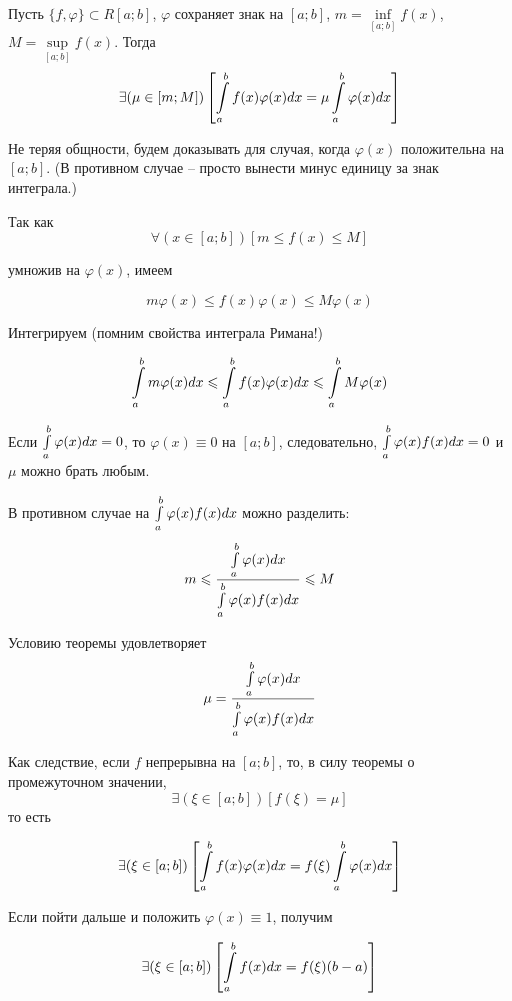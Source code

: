 \begin{teorema}
Пусть $\{f,\varphi\}\subset R[a;b]$, $\varphi$ сохраняет знак на $[a;b]$, $m=\inf\limits_{[a;b]}f(x)$, $M=\sup\limits_{[a;b]}f(x)$.
Тогда 
$$
\exists(\mu\in[m;M])\left[
\int\limits_a^b f(x)\varphi(x) dx=\mu\int\limits_a^b \varphi(x) dx
\right]
$$
\end{teorema}

\dokvo
Не теряя общности, будем доказывать для случая, когда $\varphi(x)$ положительна на $[a;b]$.
(В противном случае -- просто вынести минус единицу за знак интеграла.)

Так как
$$
\forall(x\in[a;b])[m\leq f(x)\leq M]
$$

умножив на $\varphi(x)$, имеем

$$
m\varphi(x)\leq f(x)\varphi(x) \leq M\varphi(x)
$$

Интегрируем (помним свойства интеграла Римана!)

$$
\int\limits_a^b m\varphi(x) dx \leqslant \int\limits_a^b f(x)\varphi(x) dx \leqslant \int\limits_a^b M\varphi(x)
$$

Если $\int\limits_a^b\varphi(x) dx =0$, то $\varphi(x)\equiv 0$ на $[a;b]$, следовательно, $\int\limits_a^b\varphi(x)f(x) dx=0$ и $\mu$ можно брать любым.

В противном случае на $\int\limits_a^b\varphi(x)f(x)dx$ можно разделить:
$$
m\leqslant\frac{\int\limits_a^b\varphi(x)dx }{\int\limits_a^b\varphi(x)f(x)dx }\leqslant M
$$

Условию теоремы удовлетворяет
$$
\mu=\frac{\int\limits_a^b\varphi(x)dx}{\int\limits_a^b\varphi(x)f(x)dx}
$$

\dokno

Как следствие, если $f$ непрерывна на $[a;b]$, то, в силу теоремы о промежуточном значении, 
$$
\exists(\xi\in[a;b])[f(\xi)=\mu]
$$
то есть 

$$
\exists(\xi\in[a;b])\left[
\int\limits_a^b f(x)\varphi(x) dx=f(\xi)\int\limits_a^b \varphi(x) dx
\right]
$$

Если пойти дальше и положить $\varphi(x)\equiv 1$, получим

$$
\exists(\xi\in[a;b])\left[
\int\limits_a^b f(x) dx=f(\xi)(b-a)
\right]
$$

